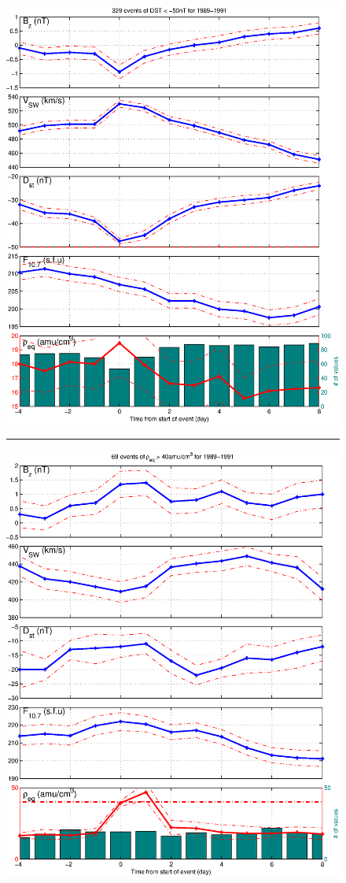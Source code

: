 \documentclass[10pt,twocolumn]{article}
\begin{document}
\begin{figure}[htp!]
\centering
\includegraphics[scale=0.45]{paperfigures/stormavs-dst-50-tak.eps}
\rule[1ex]{5cm}{0.5pt}
\includegraphics[scale=0.45]{paperfigures/stormavs-mass-tak.eps}

\end{figure}
\end{document}
